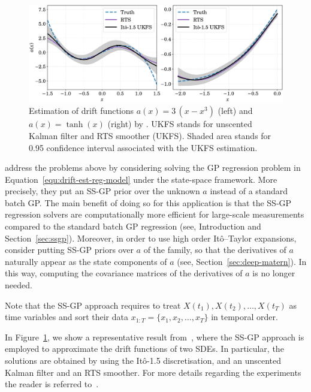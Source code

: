 \begin{figure}[t!]
	\centering
	\includegraphics[width=.99\linewidth]{figs/drift-est}
	\caption{Estimation of drift functions $a(x)=3\,(x-x^3)$ (left) and $a(x)=\tanh(x)$ (right) by \citet{ZhaoZheng2020Drift}. UKFS stands for unscented Kalman filter and RTS smoother (UKFS). Shaded area stands for 0.95 confidence interval associated with the UKFS estimation.}
	\label{fig:drift-est}
\end{figure}

\citet{ZhaoZheng2020Drift} address the problems above by considering solving the GP regression problem in Equation~\eqref{equ:drift-est-reg-model} under the state-space framework. More precisely, they put an SS-GP prior over the unknown $a$ instead of a standard batch GP. The main benefit of doing so for this application is that the SS-GP regression solvers are computationally more efficient for large-scale measurements compared to the standard batch GP regression (see, Introduction and Section~\ref{sec:ssgp}). Moreover, in order to use high order It\^{o}--Taylor expansions, \citet{ZhaoZheng2020Drift} consider putting SS-GP priors over $a$ of the \matern family, so that the derivatives of $a$ naturally appear as the state components of $a$ (see, Section~\ref{sec:deep-matern}). In this way, computing the covariance matrices of the derivatives of $a$ is no longer needed.

\begin{remark}
	Note that the SS-GP approach requires to treat $X(t_1), X(t_2), \ldots ,\allowbreak X(t_T)$ as time variables and sort their data $x_{1:T}=\lbrace x_1,x_2,\ldots,x_T \rbrace$ in temporal order. 
\end{remark}

In Figure~\ref{fig:drift-est}, we show a representative result from~\citet{ZhaoZheng2020Drift}, where the SS-GP approach is employed to approximate the drift functions of two SDEs. In particular, the solutions are obtained by using the It\^{o}-1.5 discretisation, and an unscented Kalman filter and an RTS smoother. For more details regarding the experiments the reader is referred to~\citet{ZhaoZheng2020Drift}.

